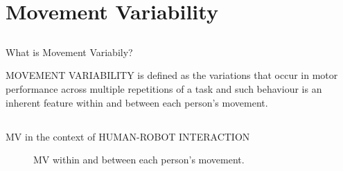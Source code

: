 
\section{Movement Variability}


\subsection{}
{


\begin{frame}{What is Movement Variabily?}

\LARGE
MOVEMENT VARIABILITY is defined as the variations that occur in motor
performance across multiple repetitions of a task and such behaviour is 
an inherent feature within and between each person's movement.
\end{frame}
}


\subsection{}
{

\begin{frame}{MV in the context of HUMAN-ROBOT INTERACTION}
    \begin{figure}
	\caption{MV within and between each person's movement.} 
   \end{figure}
	
\end{frame}
}


